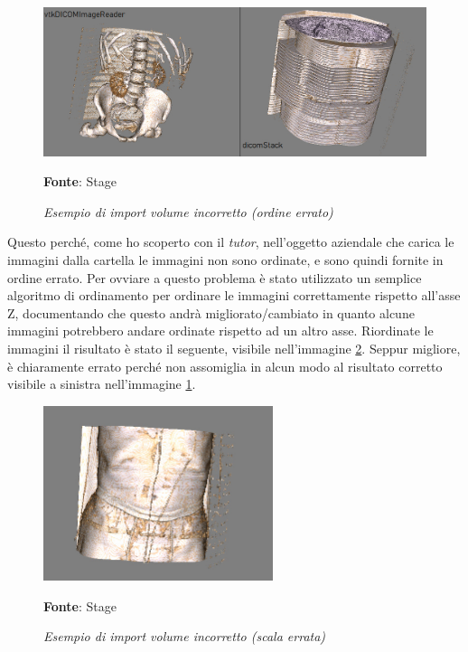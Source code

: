 \begin{figure}[h]
    \centering
    \includegraphics[width=1\textwidth]{immagini/svolgimento/volumebrokenorder.jpg}
    \caption{\textit{Esempio di import volume incorretto (ordine errato)}}
    \textbf{Fonte}: Stage
    \label{fig: Volume Wrong Order}
\end{figure}

Questo perché, come ho scoperto con il \emph{tutor}, nell'oggetto aziendale che carica le immagini dalla cartella le immagini non sono ordinate, e sono quindi fornite in ordine errato. Per ovviare a questo problema è stato utilizzato un semplice algoritmo di ordinamento per ordinare le immagini correttamente rispetto all'asse Z, documentando che questo andrà migliorato/cambiato in quanto alcune immagini potrebbero andare ordinate rispetto ad un altro asse. Riordinate le immagini il risultato è stato il seguente, visibile nell'immagine \ref{fig: Volume Wrong Scale}. Seppur migliore, è chiaramente errato perché non assomiglia in alcun modo al risultato corretto visibile a sinistra nell'immagine \ref{fig: Volume Wrong Order}.

\begin{figure}[h]
    \centering
    \includegraphics[width=0.6\textwidth]{immagini/svolgimento/volumebrokenscale.jpeg}
    \caption{\textit{Esempio di import volume incorretto (scala errata)}}
    \textbf{Fonte}: Stage
    \label{fig: Volume Wrong Scale}
\end{figure}

